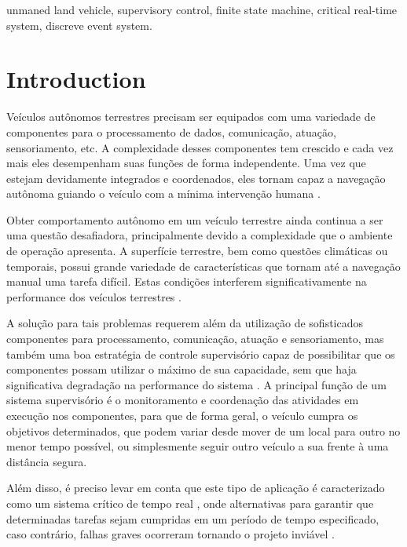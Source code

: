 \documentclass[conference]{IEEEtran}
\begin{document}
\begin{IEEEkeywords}
unmaned land vehicle, supervisory control, finite state machine, critical real-time system, discreve event system.
\end{IEEEkeywords}


\IEEEpeerreviewmaketitle
\section{Introduction}\label{sec:introduction}
Veículos autônomos terrestres precisam ser equipados com uma variedade de componentes para o processamento de dados, comunicação, atuação, sensoriamento, etc. A complexidade desses componentes tem crescido e cada vez mais eles desempenham suas funções de forma independente. Uma vez que estejam devidamente integrados e coordenados, eles tornam capaz a navegação autônoma guiando o veículo com a mínima intervenção humana \cite{autonomous_Hebert:1997:IUG:523961}. %

Obter comportamento autônomo em um veículo terrestre ainda continua a ser uma questão desafiadora, principalmente devido a complexidade que o ambiente de operação apresenta. A superfície terrestre, bem como questões climáticas ou temporais, possui grande variedade de características que tornam até a navegação manual uma tarefa difícil. Estas condições interferem significativamente na performance dos veículos terrestres \cite{supervisory_Donmez:2010:MSE:2377576.2377580}. 

A solução para tais problemas requerem além da utilização de sofisticados componentes para processamento, comunicação, atuação e sensoriamento, mas também uma boa estratégia de controle supervisório capaz de possibilitar que os componentes possam utilizar o máximo de sua capacidade, sem que haja significativa degradação na performance do sistema \cite{supervisory_Cummings_1a}. A principal função de um sistema supervisório é o monitoramento e coordenação das atividades em execução nos componentes, para que de forma geral, o veículo cumpra os objetivos determinados, que podem variar desde mover de um local para outro no menor tempo possível, ou simplesmente seguir outro veículo a sua frente à uma distância segura. 

Além disso, é preciso levar em conta que este tipo de aplicação é caracterizado como um sistema crítico de tempo real \cite{rtos_safety_mission_4062424}, %
onde alternativas para garantir que determinadas tarefas sejam cumpridas em um período de tempo especificado, caso contrário, falhas graves ocorreram tornando o projeto inviável \cite{rtos_nasa_monitors}. %
\end{document}
